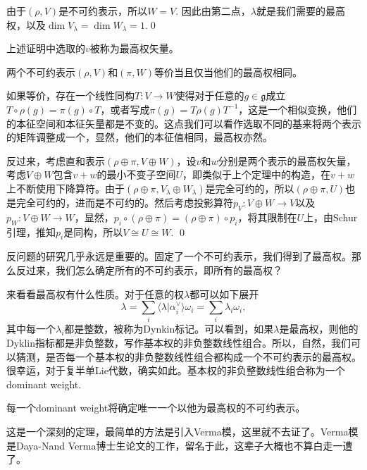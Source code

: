 \documentclass[9pt]{extarticle}
\newcommand{\lag}{{\mathfrak{g}}}
\begin{document}
由于$(\rho,V)$是不可约表示，所以$W=V$. 因此由第二点，$\lambda$就是我们需要的最高权，以及$\dim V_\lambda=\dim W_\lambda=1$.\qed 

上述证明中选取的$v$被称为最高权矢量。

\theo 两个不可约表示$(\rho,V)$和$(\pi,W)$等价当且仅当他们的最高权相同。

\proof 如果等价，存在一个线性同构$T:V\to W$使得对于任意的$g\in\lag$成立$T\circ \rho(g)=\pi(g)\circ T$，或者写成$\pi(g)=T\rho(g)T^{-1}$，这是一个相似变换，他们的本征空间和本征矢量都是不变的。这点我们可以看作选取不同的基来将两个表示的矩阵调整成一个，显然，他们的本征值相同，最高权亦然。

反过来，考虑直和表示$(\rho\oplus\pi,V\oplus W)$，设$v$和$w$分别是两个表示的最高权矢量，考虑$V\oplus W$包含$v+w$的最小不变子空间$U$，即类似于上个定理中的构造，在$v+w$上不断使用下降算符。由于$(\rho\oplus\pi,V_\lambda\oplus W_\lambda)$是完全可约的，所以$(\rho\oplus\pi,U)$也是完全可约的，进而是不可约的。然后考虑投影算符$p_V:V\oplus W\to V$以及$p_W:V\oplus W\to W$，显然，$p_i\circ (\rho\oplus\pi)=(\rho\oplus\pi)\circ p_i$，将其限制在$U$上，由Schur引理，推知$p_i$是同构，所以$V\cong U\cong W$. \qed

\para 反问题的研究几乎永远是重要的。固定了一个不可约表示，我们得到了最高权。那么反过来，我们怎么确定所有的不可约表示，即所有的最高权？

来看看最高权有什么性质。对于任意的权$\lambda$都可以如下展开
\[
	\lambda=\sum_i \langle \lambda|\alpha_i^\vee\rangle \omega_i=\sum_i \lambda_i \omega_i,
\]
其中每一个$\lambda_i$都是整数，被称为Dynkin标记。可以看到，如果$\lambda$是最高权，则他的Dyklin指标都是非负整数，写作基本权的非负整数线性组合。所以，自然，我们可以猜测，是否每一个基本权的非负整数线性组合都构成一个不可约表示的最高权。很幸运，对于复半单Lie代数，确实如此。基本权的非负整数线性组合称为一个dominant weight.



\theo 每一个dominant weight将确定唯一一个以他为最高权的不可约表示。

这是一个深刻的定理，最简单的方法是引入Verma模，这里就不去证了。Verma模是Daya-Nand Verma博士生论文的工作，留名于此，这辈子大概也不算白走一遭了。
\end{document}
